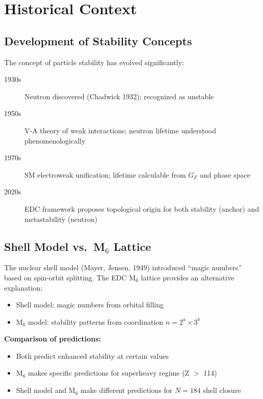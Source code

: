 \section{Historical Context}
\label{sec:x:history}

\subsection{Development of Stability Concepts}

The concept of particle stability has evolved significantly:

\begin{description}
    \item[1930s] Neutron discovered (Chadwick 1932); recognized as unstable
    \item[1950s] V-A theory of weak interactions; neutron lifetime understood
        phenomenologically
    \item[1970s] SM electroweak unification; lifetime calculable from
        $G_F$ and phase space
    \item[2020s] EDC framework proposes topological origin for both stability
        (anchor) and metastability (neutron)
\end{description}

\subsection{Shell Model vs.\ M$_6$ Lattice}

The nuclear shell model (Mayer, Jensen, 1949) introduced ``magic numbers'' based
on spin-orbit splitting. The EDC M$_6$ lattice provides an alternative explanation:

\begin{itemize}
    \item Shell model: magic numbers from orbital filling
    \item M$_6$ model: stability patterns from coordination $n = 2^a \times 3^b$
\end{itemize}

\textbf{Comparison of predictions:}
\begin{itemize}
    \item Both predict enhanced stability at certain values
    \item M$_6$ makes specific predictions for superheavy regime (Z $>$ 114)
    \item Shell model and M$_6$ make different predictions for $N = 184$ shell closure
\end{itemize}

